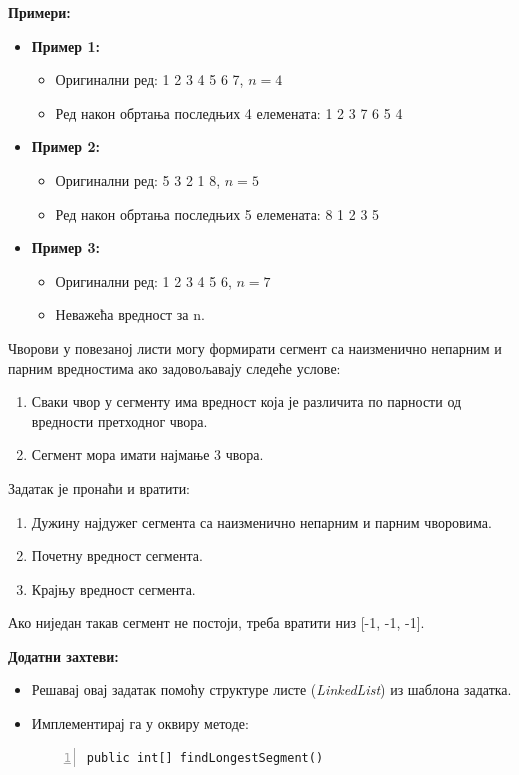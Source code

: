 \textbf{Примери:}
\begin{itemize}
    \item \textbf{Пример 1:}
    \begin{itemize}
        \item Оригинални ред: 1 2 3 4 5 6 7, $n = 4$
        \item Ред након обртања последњих 4 елемената: 1 2 3 7 6 5 4
    \end{itemize}
    \item \textbf{Пример 2:}
    \begin{itemize}
        \item Оригинални ред: 5 3 2 1 8, $n = 5$
        \item Ред након обртања последњих 5 елемената: 8 1 2 3 5
    \end{itemize}
    \item \textbf{Пример 3:}
    \begin{itemize}
        \item Оригинални ред: 1 2 3 4 5 6, $n = 7$
        \item Неважећа вредност за n.
    \end{itemize}
\end{itemize}



Чворови у повезаној листи могу формирати сегмент са наизменично непарним и парним вредностима ако задовољавају следеће услове:
\begin{enumerate}
    \item Сваки чвор у сегменту има вредност која је различита по парности од вредности претходног чвора.
    \item Сегмент мора имати најмање 3 чвора.
\end{enumerate}

Задатак је пронаћи и вратити:
\begin{enumerate}
    \item Дужину најдужег сегмента са наизменично непарним и парним чворовима.
    \item Почетну вредност сегмента.
    \item Крајњу вредност сегмента.
\end{enumerate}

Ако ниједан такав сегмент не постоји, треба вратити низ [-1, -1, -1].

\textbf{Додатни захтеви:}
\begin{itemize}
    \item Решавај овај задатак помоћу структуре листе (\textit{LinkedList}) из шаблона задатка.
    \item Имплементирај га у оквиру методе:
    \begin{Verbatim}[fontsize=\footnotesize, numbers=left, xleftmargin=10mm]
public int[] findLongestSegment()
    \end{Verbatim}
\end{itemize}

